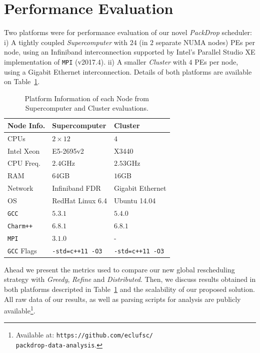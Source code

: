 \section{Performance Evaluation} \label{sec:eval}

Two platforms were for performance evaluation of our novel \textit{PackDrop} scheduler:
i) A tightly coupled \textit{Supercomputer} with $24$ (in $2$ separate NUMA nodes) PEs per node, using an Infiniband interconnection supported by Intel's Parallel Studio XE implementation of \texttt{MPI} (v2017.4).
ii) A smaller \textit{Cluster} with $4$ PEs per node, using a Gigabit Ethernet interconnection.
Details of both platforms are available on Table~\ref{tab:ptinfo}.

\begin{table}[ht]
    \centering
    \caption{Platform Information of each Node from Supercomputer and Cluster evaluations.}
	\begin{tabular}{l|l|l}
	Node Info.	 		& Supercomputer 		& Cluster \\ \hline
        CPUs	   			& $2\times12$ 			& $4$ \\
        Intel Xeon			& E5-2695v2 			& X3440\\
        CPU Freq.  			& $2.4$GHz   			& $2.53$GHz\\
        RAM        			& $64$GB			& $16$GB\\
        Network 			& Infiniband FDR 		& Gigabit Ethernet\\
        OS      			& RedHat Linux 6.4 		& Ubuntu 14.04\\
        \texttt{GCC}			& $5.3.1$			& $5.4.0$\\
        \texttt{Charm++} 		& $6.8.1$ 			& $6.8.1$\\
        \texttt{MPI}			& $3.1.0$			& -\\
        \texttt{GCC} Flags		& \texttt{-std=c++11 -O3} 	& \texttt{-std=c++11 -O3} \\
	\end{tabular}
    \label{tab:ptinfo}
\end{table}

Ahead we present the metrics used to compare our new global rescheduling strategy with \textit{Greedy}, \textit{Refine} and \textit{Distributed}.   
Then, we discuss results obtained in both platforms descripted in Table~\ref{tab:ptinfo} and the scalability of our proposed solution.
All raw data of our results, as well as parsing scripts for analysis are publicly available\footnote{Available at: \texttt{https://github.com/eclufsc/\\packdrop-data-analysis}.}.

